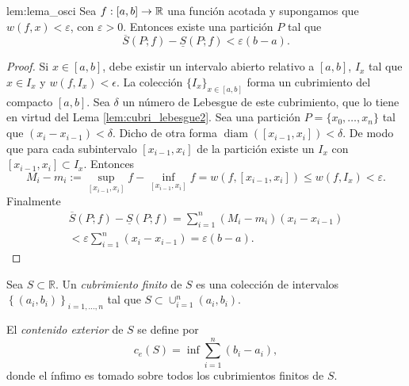 \begin{lema}{lem:lema_osci} Sea $f:[a,b]\to\mathbb{R}$ una función acotada y supongamos que   $w(f,x)<\varepsilon$, con $\varepsilon>0$. Entonces existe una partición $P$ tal que 
\begin{equation}\label{eq:lema_oscila}
 \overline{S}(P;f)-\underline{S}(P;f)<\varepsilon(b-a).
\end{equation}
 
\end{lema}
\begin{proof} Si $x\in [a,b]$, debe existir un intervalo abierto relativo a $[a,b]$,  $I_x$ tal que $x\in I_x$ y $w(f,I_x)<\epsilon$. La colección $\{I_x\}_{x\in [a,b]}$ forma un cubrimiento del compacto $[a,b]$. Sea $\delta$ un número de Lebesgue de este cubrimiento, que lo tiene en virtud del Lema \ref{lem:cubri_lebesgue2}. Sea una partición $P=\{x_0,\ldots,x_n\}$ tal que $(x_i-x_{i-1})<\delta$. Dicho de otra forma $\operatorname{diam}( [x_{i-1},x_i])<\delta$. De modo que para cada subintervalo $[x_{i-1},x_i]$ de la partición existe un $I_x$ con $[x_{i-1},x_i]\subset I_x$. Entonces 
\[
 M_i-m_i:=\sup\limits_{[x_{i-1},x_i]} f-\inf\limits_{[x_{i-1},x_i]} f=w(f,[x_{i-1},x_i])\leq w(f,I_x)<\varepsilon.
\]
Finalmente
\begin{multline*}
  \overline{S}(P;f)-\underline{S}(P;f)=\sum_{i=1}^n( M_i-m_i)(x_i-x_{i-1})\\
           <\varepsilon\sum_{i=1}^n(x_i-x_{i-1})=\varepsilon(b-a).
\end{multline*}




 
\end{proof}





 \begin{definicion}{} Sea $S\subset\mathbb{R}$. Un \emph{cubrimiento finito} de $S$ es una colección de intervalos $\left\{ (a_i,b_i)\right\}_{i=1,\ldots,n}$ tal que $S\subset \cup_{i=1}^n(a_{i},b_i)$.
 
 El \emph{contenido exterior} de $S$ se define por 
 \begin{equation}\label{eq:def_cont_e}
  c_e(S)=\inf \sum_{i=1}^n (b_i-a_i),
 \end{equation}
donde el ínfimo es tomado sobre todos los cubrimientos finitos de $S$.
  
 \end{definicion}
 

